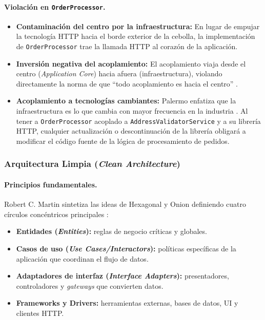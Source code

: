 \paragraph{Violación en \texttt{OrderProcessor}.}
\begin{itemize}
    \item \textbf{Contaminación del centro por la infraestructura:} En lugar de empujar la tecnología HTTP hacia el borde exterior de la cebolla, la implementación de \texttt{OrderProcessor} trae la llamada HTTP al corazón de la aplicación.
    \item \textbf{Inversión negativa del acoplamiento:} El acoplamiento viaja desde el centro (\emph{Application Core}) hacia afuera (infraestructura), violando directamente la norma de que \enquote{todo acoplamiento es hacia el centro} \parencite{palermo2008}.
    \item \textbf{Acoplamiento a tecnologías cambiantes:} Palermo enfatiza que la infraestructura es lo que cambia con mayor frecuencia en la industria \parencite{palermo2008}. Al tener a \texttt{OrderProcessor} acoplado a \texttt{AddressValidatorService} y a su librería HTTP, cualquier actualización o descontinuación de la librería obligará a modificar el código fuente de la lógica de procesamiento de pedidos.
\end{itemize}

\subsubsection*{Arquitectura Limpia (\emph{Clean Architecture})}

\paragraph{Principios fundamentales.} Robert C. Martin sintetiza las ideas de Hexagonal y Onion definiendo cuatro círculos concéntricos principales \parencite{martin2017}:

\begin{itemize}
    \item \textbf{Entidades (\emph{Entities}):} reglas de negocio críticas y globales.
    \item \textbf{Casos de uso (\emph{Use Cases/Interactors}):} políticas específicas de la aplicación que coordinan el flujo de datos.
    \item \textbf{Adaptadores de interfaz (\emph{Interface Adapters}):} presentadores, controladores y \emph{gateways} que convierten datos.
    \item \textbf{Frameworks y Drivers:} herramientas externas, bases de datos, UI y clientes HTTP.
\end{itemize}

